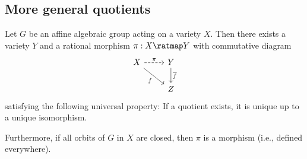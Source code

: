 \subsection{More general quotients}

    \begin{theorem}\label{thm:existence_of_quotient_by_algebraic_group}
        Let \(G\) be an affine algebraic group acting on a variety \(X\).
        Then there exists a variety \(Y\) and a rational morphism \(\pi: X \ratmap Y\) with commutative diagram
        \[
            \begin{tikzcd}
                X \arrow[r, dashed, "\pi"] \arrow[rd, "f"'] & Y \arrow[d, "\overline{f}"] \\
                & Z
            \end{tikzcd}
        \]
        satisfying the following universal property:
        If a quotient exists, it is unique up to a unique isomorphism.

        Furthermore, if all orbits of \(G\) in \(X\) are closed, then \(\pi\) is a morphism (i.e., defined everywhere).
    \end{theorem}